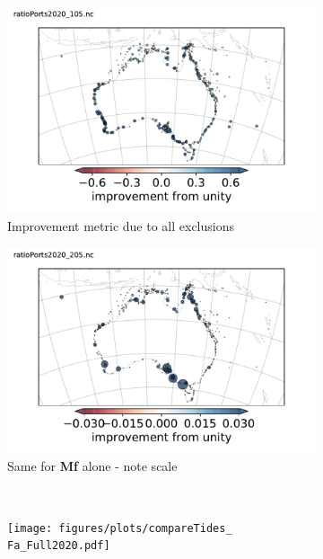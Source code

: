\begin{figure}[H]\centering    
    \begin{subfigure}[b]{\figwidthHalf}
        \includegraphics[trim={0 0 0 1cm},clip,width=\textwidth]{figures/maps/otpsPortCompare_Improve2020_105_diffRmse.pdf}
        \caption{Improvement metric due to all exclusions}
    \end{subfigure}
    \begin{subfigure}[b]{\figwidthHalf}
        \includegraphics[trim={0 0 0 1cm},clip,width=\textwidth]{figures/maps/otpsPortCompare_Improve2020_205_diffRmse.pdf}
        \caption{Same for \textbf{Mf} alone - note scale}
    \end{subfigure}
    \\
    \begin{subfigure}[b]{\figwidthThird}
        \texttt{[image: figures/plots/compareTides\_\\Fa\_Full2020.pdf]} 

\end{subfigure}
\end{figure}
